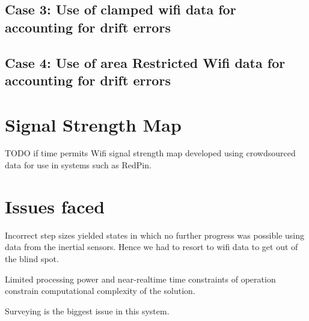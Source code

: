 \subsection{Case 3: Use of clamped wifi data for accounting for drift errors}
\subsection{Case 4: Use of area Restricted Wifi data for accounting for drift errors}

\section{Signal Strength Map}

TODO if time permits
Wifi signal strength map developed using crowdsourced data for use in systems such as RedPin.

\section{Issues faced}
Incorrect step sizes yielded states in which no further progress was possible using data from the inertial sensors. Hence we had to resort to wifi data to get out of the blind spot.

Limited processing power and near-realtime time constraints of operation constrain computational 
complexity of the solution.

Surveying is the biggest issue in this system.

